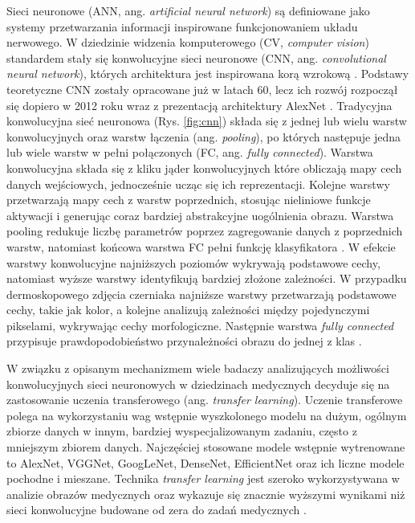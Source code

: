 Sieci neuronowe (ANN, ang. \textit{artificial neural network}) są definiowane jako systemy przetwarzania informacji inspirowane funkcjonowaniem układu nerwowego.
W dziedzinie widzenia komputerowego (CV, \textit{computer vision}) standardem stały się konwolucyjne sieci neuronowe (CNN, ang. \textit{convolutional neural network}), których architektura jest inspirowana korą wzrokową \cite{Ghosh_2020, Hubel_Wiesel_1968}.
Podstawy teoretyczne CNN zostały opracowane już w latach 60, lecz ich rozwój rozpoczął się dopiero w 2012 roku wraz z prezentacją architektury AlexNet \cite{Krizhevsky_2012, Hubel_Wiesel_1968}.
Tradycyjna konwolucyjna sieć neuronowa (Rys. \ref{fig:cnn}) składa się z jednej lub wielu warstw konwolucyjnych oraz warstw łączenia (ang. \textit{pooling}), po których następuje jedna lub wiele warstw w pełni połączonych (FC, ang. \textit{fully connected}).
Warstwa konwolucyjna składa się z kliku jąder konwolucyjnych które obliczają mapy cech danych wejściowych, jednocześnie ucząc się ich reprezentacji.
Kolejne warstwy przetwarzają mapy cech z warstw poprzednich, stosując nieliniowe funkcje aktywacji i generując coraz bardziej abstrakcyjne uogólnienia obrazu. 
Warstwa pooling redukuje liczbę parametrów poprzez zagregowanie danych z poprzednich warstw, natomiast końcowa warstwa FC pełni funkcję klasyfikatora \cite{Ghosh_2020}.
W efekcie warstwy konwolucyjne najniższych poziomów wykrywają podstawowe cechy, natomiast wyższe warstwy identyfikują bardziej złożone zależności.
W przypadku dermoskopowego zdjęcia czerniaka najniższe warstwy przetwarzają podstawowe cechy, takie jak kolor, a kolejne analizują zależności między pojedynczymi pikselami, wykrywając cechy morfologiczne. 
Następnie warstwa \textit{fully connected} przypisuje prawdopodobieństwo przynależności obrazu do jednej z klas \cite{Ghosh_2020}.

W związku z opisanym mechanizmem wiele badaczy analizujących możliwości konwolucyjnych sieci neuronowych w dziedzinach medycznych decyduje się na zastosowanie uczenia transferowego (ang. \textit{transfer learning}).
Uczenie transferowe polega na wykorzystaniu wag wstępnie wyszkolonego modelu na dużym, ogólnym zbiorze danych w innym, bardziej wyspecjalizowanym zadaniu, często z mniejszym zbiorem danych.
Najczęściej stosowane modele wstępnie wytrenowane to AlexNet, VGGNet, GoogLeNet, DenseNet, EfficientNet oraz ich liczne modele pochodne i mieszane.
Technika \textit{transfer learning} jest szeroko wykorzystywana w analizie obrazów medycznych oraz wykazuje się znacznie wyższymi wynikami niż sieci konwolucyjne budowane od zera do zadań medycznych \cite{Ghosh_2020, Mahbod_Schaefer_Wang_Dorffner_Ecker_Ellinger_2020, kanavati2021partialtransfusionexpressiveinfluence}.

